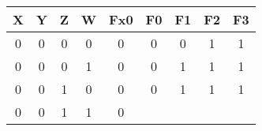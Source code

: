 \begin{tabular}{|c|c|c|c||c|c|c|c|c|}
\hline
X & Y & Z & W

  & Fx0

  & F0

  & F1

  & F2

  & F3
 \\
\hline

  
  
  0 & 0 & 0 & 0
  
    
    
    & 0
  
    
    
    & 0
  
    
    
    & 0
  
    
    
    & 1
  
    
    
    & 1
   \\
  

  
  
  0 & 0 & 0 & 1
  
    
    
    & 0
  
    
    
    & 0
  
    
    
    & 1
  
    
    
    & 1
  
    
    
    & 1
   \\
  

  
  
  0 & 0 & 1 & 0
  
    
    
    & 0
  
    
    
    & 0
  
    
    
    & 1
  
    
    
    & 1
  
    
    
    & 1
   \\
  

  
  
  0 & 0 & 1 & 1
  
    
    
    & 0
  

\end{tabular}
